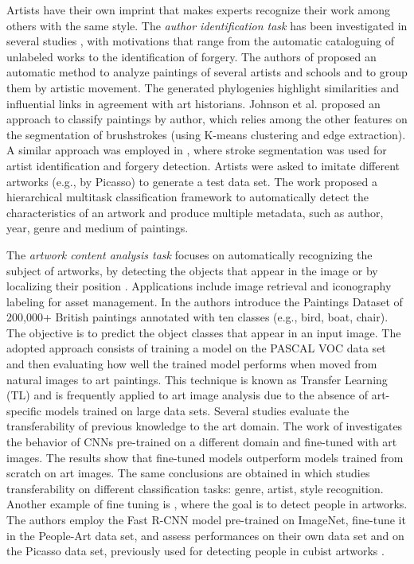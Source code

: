 \documentclass[acmlarge]{acmart}
\begin{document}
Artists have their own imprint that makes experts recognize their work among others with the same style. The \textit{author identification task}  has been investigated in several studies   \cite{keren2002painter,mensink2014rijksmuseum}, with motivations that range from the automatic cataloguing of unlabeled works to the identification of forgery. The authors of \cite{shamir2012computer} proposed an automatic method to analyze paintings of several artists and schools and to group them by artistic movement. The generated phylogenies highlight similarities and influential links in agreement with art historians. Johnson et al. \cite{johnson2008image} proposed an approach to classify paintings by author, which relies among the other features on the segmentation of brushstrokes (using K-means clustering and edge extraction). A similar approach was employed in \cite{elgammal2018picasso}, where stroke segmentation was used for artist identification and forgery detection. Artists were asked to imitate different artworks (e.g., by Picasso)   to generate a test data set.  The work \cite{belhi2018towards} proposed a hierarchical multitask classification framework to automatically detect the characteristics  of an artwork and   produce   multiple metadata, such as author, year, genre and medium of paintings. 

The \textit{artwork content analysis task} focuses on automatically recognizing the  subject of artworks, by detecting the objects that appear in the image or by localizing their position  \cite{crowley2013gods,cai2015cross,gonthier2018weakly,shen2019discovering}. 
Applications include image retrieval and iconography labeling for asset management. In \cite{crowley2014state} the authors introduce the Paintings Dataset of 200,000+  British paintings annotated with ten classes (e.g., bird, boat, chair). The objective is to predict the object classes that appear in an input image.  The adopted approach consists of training a model on the PASCAL VOC \cite{everingham2015pascal} data set and then evaluating how well the trained model  performs when  moved from natural images to art paintings. This technique is  known as Transfer Learning (TL) \cite{pan2009survey} and is  frequently applied to art image analysis due to the absence of art-specific  models trained on large data sets. Several studies evaluate the transferability of previous knowledge to the art domain. The work of \cite{sabatelli2018deep} investigates the behavior of CNNs  pre-trained on a  different domain and fine-tuned with art images. The results show that fine-tuned models outperform models trained from scratch on art images. The same conclusions are obtained in \cite{cetinic2018fine} which studies transferability on different classification tasks: genre, artist, style recognition.
Another example of fine tuning is \cite{westlake2016detecting}, where the goal is to detect people in  artworks. The authors employ  the Fast R-CNN \cite{girshick2015fast} model pre-trained on ImageNet,  fine-tune it in the People-Art data set, and assess  performances on their own data set and on the Picasso data set,  previously used for detecting people in cubist artworks \cite{ginosar2014detecting}. 
\end{document}
